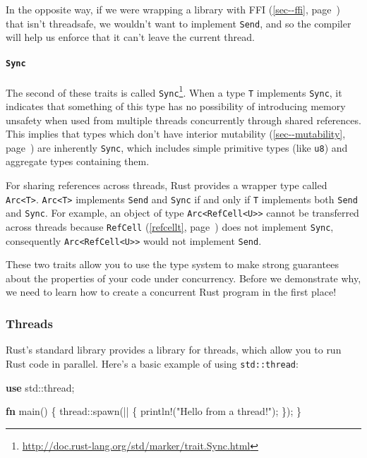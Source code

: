 \documentclass[a4paper,]{book}
\renewcommand*{\hyperref}[2][\ar]{%
  \def\ar{#2}%
  #2 (\autoref{#1}, page~\pageref{#1})}
\newenvironment{Shaded}{\begin{snugshade}}{\end{snugshade}}
\newcommand{\KeywordTok}[1]{\textcolor[rgb]{0.13,0.29,0.53}{\textbf{{#1}}}}
\newcommand{\StringTok}[1]{\textcolor[rgb]{0.31,0.60,0.02}{{#1}}}
\newcommand{\OtherTok}[1]{\textcolor[rgb]{0.56,0.35,0.01}{{#1}}}
\newcommand{\NormalTok}[1]{{#1}}
\renewcommand{\href}[2]{#2\footnote{\url{#1}}}
\let\oldparagraph\paragraph
\renewcommand{\paragraph}[1]{\oldparagraph{#1}\mbox{}}
\begin{document}
In the opposite way, if we were wrapping a library with
\hyperref[sec--ffi]{FFI} that isn't threadsafe, we wouldn't want to
implement \texttt{Send}, and so the compiler will help us enforce that
it can't leave the current thread.

\paragraph{\texorpdfstring{\texttt{Sync}}{Sync}}\label{sync}

The second of these traits is called
\href{http://doc.rust-lang.org/std/marker/trait.Sync.html}{\texttt{Sync}}.
When a type \texttt{T} implements \texttt{Sync}, it indicates that
something of this type has no possibility of introducing memory unsafety
when used from multiple threads concurrently through shared references.
This implies that types which don't have
\hyperref[sec--mutability]{interior mutability} are inherently
\texttt{Sync}, which includes simple primitive types (like \texttt{u8})
and aggregate types containing them.

For sharing references across threads, Rust provides a wrapper type
called \texttt{Arc\textless{}T\textgreater{}}.
\texttt{Arc\textless{}T\textgreater{}} implements \texttt{Send} and
\texttt{Sync} if and only if \texttt{T} implements both \texttt{Send}
and \texttt{Sync}. For example, an object of type
\texttt{Arc\textless{}RefCell\textless{}U\textgreater{}\textgreater{}}
cannot be transferred across threads because
\hyperref[refcellt]{\texttt{RefCell}} does not implement \texttt{Sync},
consequently
\texttt{Arc\textless{}RefCell\textless{}U\textgreater{}\textgreater{}}
would not implement \texttt{Send}.

These two traits allow you to use the type system to make strong
guarantees about the properties of your code under concurrency. Before
we demonstrate why, we need to learn how to create a concurrent Rust
program in the first place!

\subsubsection{Threads}\label{threads}

Rust's standard library provides a library for threads, which allow you
to run Rust code in parallel. Here's a basic example of using
\texttt{std::thread}:

\begin{Shaded}
\begin{Highlighting}[]
\KeywordTok{use} \NormalTok{std::thread;}

\KeywordTok{fn} \NormalTok{main() \{}
    \NormalTok{thread::spawn(|| \{}
        \OtherTok{println!}\NormalTok{(}\StringTok{"Hello from a thread!"}\NormalTok{);}
    \NormalTok{\});}
\NormalTok{\}}
\end{Highlighting}
\end{Shaded}
\end{document}
